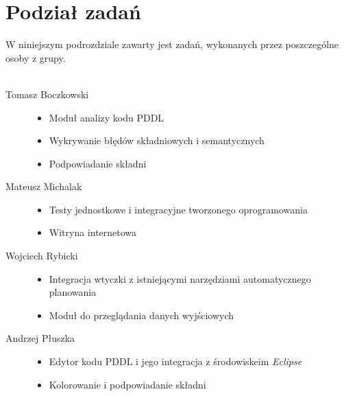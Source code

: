 \section{Podział zadań}
W niniejszym podrozdziale zawarty jest zadań, wykonanych przez poszczególne osoby z grupy.\\\\
\begin{description}
  \item[Tomasz Boczkowski] \hfill 
  \begin{itemize}
\item Moduł analizy kodu PDDL
\item Wykrywanie błędów składniowych i semantycznych
\item Podpowiadanie składni
\end{itemize}
  \item[Mateusz Michalak] \hfill 
    \begin{itemize}
\item Testy jednostkowe i integracyjne tworzonego oprogramowania
\item Witryna internetowa
\end{itemize}
  \item[Wojciech Rybicki] \hfill 
    \begin{itemize}
\item Integracja wtyczki z istniejącymi narzędziami automatycznego planowania
\item Moduł do przeglądania danych wyjściowych
\end{itemize}
  \item[Andrzej Płuszka] \hfill 
    \begin{itemize}
\item Edytor kodu PDDL i jego integracja z środowiskeim \textit{Eclipse}
\item Kolorowanie i podpowiadanie składni
\end{itemize}
\end{description}




